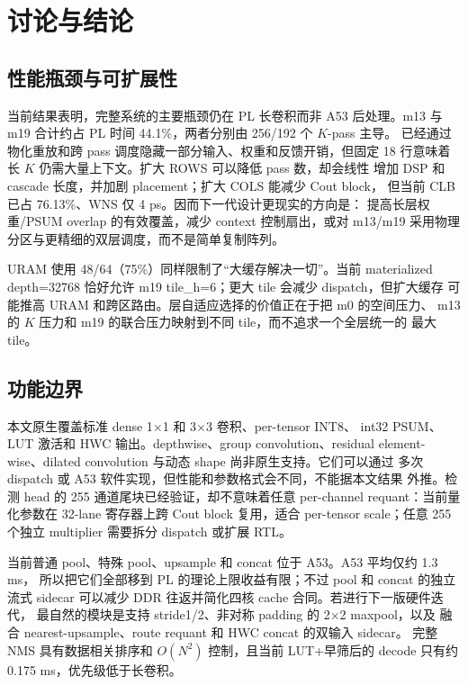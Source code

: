 \section{讨论与结论}
\label{sec:discussion}

\subsection{性能瓶颈与可扩展性}

当前结果表明，完整系统的主要瓶颈仍在 PL 长卷积而非 A53 后处理。m13 与
m19 合计约占 PL 时间 44.1\%，两者分别由 256/192 个 $K$-pass 主导。\LASA
已经通过物化重放和跨 pass 调度隐藏一部分输入、权重和反馈开销，但固定
18 行意味着长 $K$ 仍需大量上下文。扩大 ROWS 可以降低 pass 数，却会线性
增加 DSP 和 cascade 长度，并加剧 placement；扩大 COLS 能减少 Cout block，
但当前 CLB 已占 76.13\%、WNS 仅 4 ps。因而下一代设计更现实的方向是：
提高长层权重/PSUM overlap 的有效覆盖，减少 context 控制扇出，或对 m13/m19
采用物理分区与更精细的双层调度，而不是简单复制阵列。

URAM 使用 48/64（75\%）同样限制了“大缓存解决一切”。当前 materialized
depth=32768 恰好允许 m19 tile\_h=6；更大 tile 会减少 dispatch，但扩大缓存
可能推高 URAM 和跨区路由。层自适应选择的价值正在于把 m0 的空间压力、
m13 的 $K$ 压力和 m19 的联合压力映射到不同 tile，而不追求一个全层统一的
最大 tile。

\subsection{功能边界}

本文原生覆盖标准 dense 1$\times$1 和 3$\times$3 卷积、per-tensor INT8、
int32 PSUM、LUT 激活和 HWC 输出。depthwise、group convolution、residual
element-wise、dilated convolution 与动态 shape 尚非原生支持。它们可以通过
多次 dispatch 或 A53 软件实现，但性能和参数格式会不同，不能据本文结果
外推。检测 head 的 255 通道尾块已经验证，却不意味着任意 per-channel
requant：当前量化参数在 32-lane 寄存器上跨 Cout block 复用，适合 per-tensor
scale；任意 255 个独立 multiplier 需要拆分 dispatch 或扩展 RTL。

当前普通 pool、特殊 pool、upsample 和 concat 位于 A53。A53 平均仅约 1.3 ms，
所以把它们全部移到 PL 的理论上限收益有限；不过 pool 和 concat 的独立流式
sidecar 可以减少 DDR 往返并简化四核 cache 合同。若进行下一版硬件迭代，
最自然的模块是支持 stride1/2、非对称 padding 的 2$\times$2 maxpool，以及
融合 nearest-upsample、route requant 和 HWC concat 的双输入 sidecar。
完整 NMS 具有数据相关排序和 $O(N^2)$ 控制，且当前 LUT+早筛后的 decode
只有约 0.175 ms，优先级低于长卷积。

